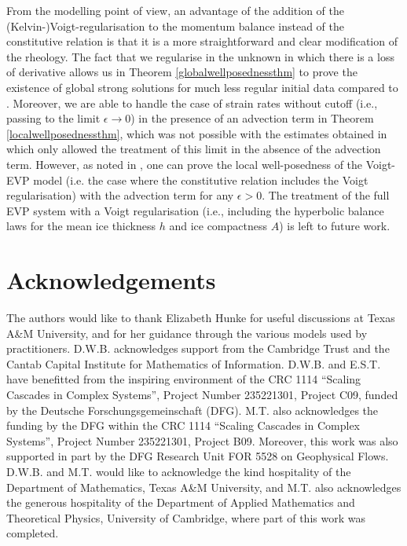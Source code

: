 \documentclass[12pt,a4paper]{article}
\theoremstyle{definition}
\theoremstyle{remark}
\numberwithin{equation}{section}
\begin{document}
From the modelling point of view, an advantage of the addition of the (Kelvin-)Voigt-regularisation to the momentum balance instead of the constitutive relation is that it is a more straightforward and clear modification of the rheology. The fact that we regularise in the unknown in which there is a loss of derivative allows us in Theorem \ref{globalwellposednessthm} to prove the existence of global strong solutions for much less regular initial data compared to \cite{boutros2025}. Moreover, we are able to handle the case of strain rates without cutoff (i.e., passing to the limit $\epsilon \rightarrow 0$) in the presence of an advection term in Theorem \ref{localwellposednessthm}, which was not possible with the estimates obtained in \cite{boutros2025} which only allowed the treatment of this limit in the absence of the advection term. However, as noted in \cite{boutros2025}, one can prove the local well-posedness of the Voigt-EVP model (i.e. the case where the constitutive relation includes the Voigt regularisation) with the advection term for any $\epsilon > 0$. The treatment of the full EVP system with a Voigt regularisation (i.e., including the hyperbolic balance laws for the mean ice thickness $h$ and ice compactness $A$) is left to future work. 

\section*{Acknowledgements}
The authors would like to thank Elizabeth Hunke for useful discussions at Texas A\&M University, and for her guidance through the various models used by practitioners. D.W.B. acknowledges support from the Cambridge Trust and the Cantab Capital Institute for Mathematics of Information. D.W.B. and E.S.T. have benefitted from the inspiring environment of the CRC 1114 ``Scaling Cascades in Complex Systems'', Project Number 235221301, Project C09, funded by the Deutsche Forschungsgemeinschaft (DFG). M.T. also acknowledges the funding by the DFG within the CRC 1114 ``Scaling Cascades in Complex Systems'', Project Number 235221301, Project B09. Moreover, this work was also supported in part by the DFG Research Unit FOR 5528 on Geophysical Flows. D.W.B. and M.T. would like to acknowledge the kind hospitality of the Department of Mathematics, Texas A\&M University, and M.T. also acknowledges the generous hospitality of the Department of Applied Mathematics and Theoretical Physics, University of Cambridge, where part of this work was completed.

\footnotesize


\end{document}
